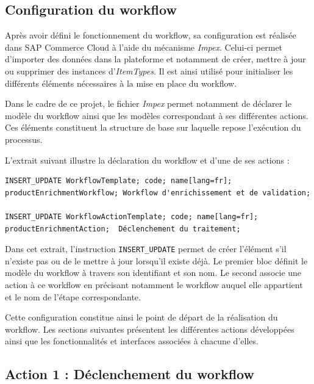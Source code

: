 \subsection{Configuration du workflow}

Après avoir défini le fonctionnement du workflow, sa configuration est réalisée dans SAP Commerce Cloud à l'aide du mécanisme \textit{Impex}. Celui-ci permet d'importer des données dans la plateforme et notamment de créer, mettre à jour ou supprimer des instances d'\textit{ItemTypes}. Il est ainsi utilisé pour initialiser les différents éléments nécessaires à la mise en place du workflow.

Dans le cadre de ce projet, le fichier \textit{Impex} permet notamment de déclarer le modèle du workflow ainsi que les modèles correspondant à ses différentes actions. Ces éléments constituent la structure de base sur laquelle repose l'exécution du processus.

L'extrait suivant illustre la déclaration du workflow et d'une de ses actions :

\begin{tcolorbox}[
colback=gray!5,
colframe=gray!60,
title=\textbf{Extrait de la configuration Impex du workflow},
fonttitle=\small,
coltitle=black,
boxrule=0.6pt,
arc=2mm,
left=3mm,
right=3mm,
top=2mm,
bottom=2mm
]
\begin{verbatim}
INSERT_UPDATE WorkflowTemplate; code; name[lang=fr];
productEnrichmentWorkflow; Workflow d'enrichissement et de validation;

INSERT_UPDATE WorkflowActionTemplate; code; name[lang=fr];
productEnrichmentAction;  Déclenchement du traitement;
\end{verbatim}
\end{tcolorbox}

Dans cet extrait, l'instruction \verb|INSERT_UPDATE| permet de créer l'élément s'il n'existe pas ou de le mettre à jour lorsqu'il existe déjà. Le premier bloc définit le modèle du workflow à travers son identifiant et son nom. Le second associe une action à ce workflow en précisant notamment le workflow auquel elle appartient et le nom de l'étape correspondante.

Cette configuration constitue ainsi le point de départ de la réalisation du workflow. Les sections suivantes présentent les différentes actions développées ainsi que les fonctionnalités et interfaces associées à chacune d'elles.

\subsection{Action 1 : Déclenchement du workflow}

